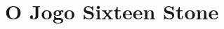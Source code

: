 \documentclass[a4paper]{article}
\begin{document}

\newpage

%
%
%
%
%
%
%



\tableofcontents

\newpage


\section{O Jogo Sixteen Stone}
\end{document}

